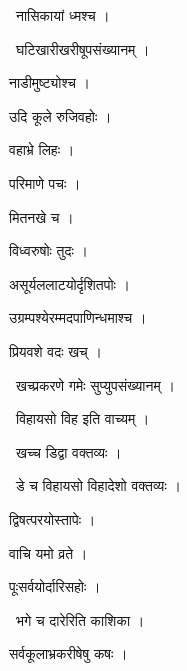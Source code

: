 \documentclass[10pt, openany, oneside]{book}
\begin{document}
\par\noindent\hspace{1.5em}{\vps वा॰}~{\qt नासिकायां ध्मश्च ।}

\par\noindent\hspace{1.5em}{\vps वा॰}~{\qt घटिखारीखरीषूपसंख्यानम् ।}

\noindent नाडीमुष्ट्योश्च ।

\noindent उदि कूले रुजिवहोः ।

\noindent वहाभ्रे लिहः ।

\noindent परिमाणे पचः ।

\noindent मितनखे च ।

\noindent विध्वरुषोः तुदः ।

\noindent असूर्यललाटयोर्दृशितपोः ।

\noindent उग्रम्पश्येरम्मदपाणिन्धमाश्च ।

\noindent प्रियवशे वदः खच् ।

\par\noindent\hspace{1.5em}{\vps वा॰}~{\qt खच्प्रकरणे गमेः सुप्युपसंख्यानम् ।}

\par\noindent\hspace{1.5em}{\vps वा॰}~{\qt विहायसो विह इति वाच्यम् ।}

\par\noindent\hspace{1.5em}{\vps वा॰}~{\qt खच्च डिद्वा वक्तव्यः ।}

\par\noindent\hspace{1.5em}{\vps वा॰}~{\qt डे च विहायसो विहादेशो वक्तव्यः ।}

\noindent द्विषत्परयोस्तापेः ।

\noindent वाचि यमो व्रते ।

\noindent पूःसर्वयोर्दारिसहोः ।

\par\noindent\hspace{1.5em}{\vps वा॰}~{\qt भगे च दारेरिति काशिका ।}

\noindent सर्वकूलाभ्रकरीषेषु कषः ।
\end{document}
